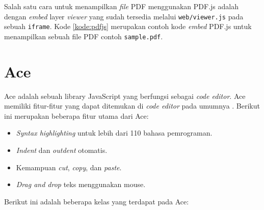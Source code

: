 Salah satu cara untuk menampilkan \textit{file} PDF menggunakan PDF.js adalah dengan \textit{embed} layer \textit{viewer} yang sudah tersedia melalui \verb|web/viewer.js| pada sebuah \verb|iframe|. Kode \ref{kode:pdfjs} merupakan contoh kode \textit{embed} PDF.js untuk menampilkan sebuah file PDF contoh \verb|sample.pdf|.

\section{Ace}
\label{sec:ace} 
Ace adalah sebuah library JavaScript yang berfungsi sebagai \textit{code editor}.
Ace memiliki fitur-fitur yang dapat ditemukan di \textit{code editor} pada umumnya \cite{ace}. Berikut ini merupakan beberapa fitur utama dari Ace: 

\begin{itemize}
    \item \textit{Syntax highlighting} untuk lebih dari 110 bahasa pemrograman.
    \item \textit{Indent} dan \textit{outdent} otomatis.
    \item Kemampuan \textit{cut}, \textit{copy}, dan \textit{paste}.
    \item \textit{Drag and drop} teks menggunakan mouse.
\end{itemize}

Berikut ini adalah beberapa kelas yang terdapat pada Ace:

